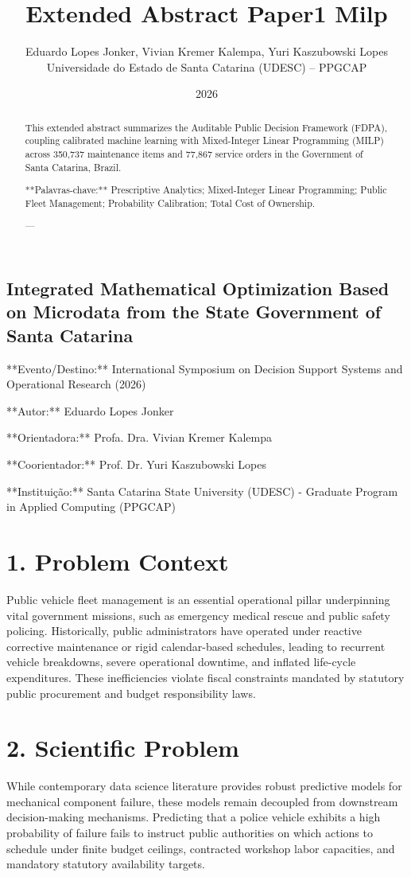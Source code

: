 \documentclass[10pt,a4paper,journal]{article}
\title{Extended Abstract Paper1 Milp}
\author{Eduardo Lopes Jonker, Vivian Kremer Kalempa, Yuri Kaszubowski Lopes\\ \small Universidade do Estado de Santa Catarina (UDESC) -- PPGCAP}
\date{2026}
\begin{document}
\maketitle

\subsection{Integrated Mathematical Optimization Based on Microdata from the State Government of Santa Catarina}
**Evento/Destino:** International Symposium on Decision Support Systems and Operational Research (2026)

**Autor:** Eduardo Lopes Jonker

**Orientadora:** Profa. Dra. Vivian Kremer Kalempa

**Coorientador:** Prof. Dr. Yuri Kaszubowski Lopes

**Instituição:** Santa Catarina State University (UDESC) - Graduate Program in Applied Computing (PPGCAP)

\begin{abstract}
This extended abstract summarizes the Auditable Public Decision Framework (FDPA), coupling calibrated machine learning with Mixed-Integer Linear Programming (MILP) across 350,737 maintenance items and 77,867 service orders in the Government of Santa Catarina, Brazil.

**Palavras-chave:** Prescriptive Analytics; Mixed-Integer Linear Programming; Public Fleet Management; Probability Calibration; Total Cost of Ownership.

---

\end{abstract}

\section{1. Problem Context}
Public vehicle fleet management is an essential operational pillar underpinning vital government missions, such as emergency medical rescue and public safety policing. Historically, public administrators have operated under reactive corrective maintenance or rigid calendar-based schedules, leading to recurrent vehicle breakdowns, severe operational downtime, and inflated life-cycle expenditures. These inefficiencies violate fiscal constraints mandated by statutory public procurement and budget responsibility laws.

\section{2. Scientific Problem}
While contemporary data science literature provides robust predictive models for mechanical component failure, these models remain decoupled from downstream decision-making mechanisms. Predicting that a police vehicle exhibits a high probability of failure fails to instruct public authorities on which actions to schedule under finite budget ceilings, contracted workshop labor capacities, and mandatory statutory availability targets.
\end{document}

